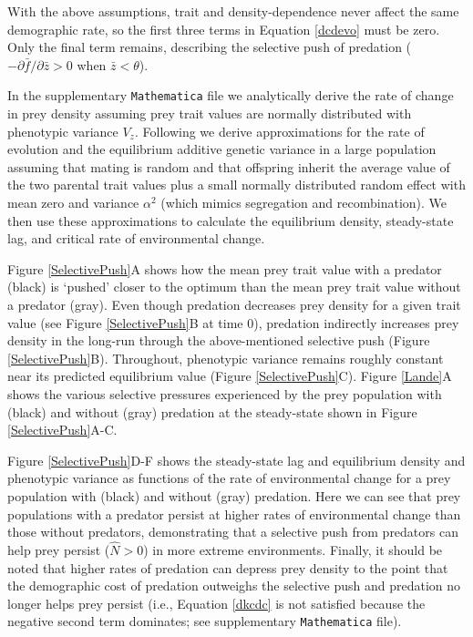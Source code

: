 \documentclass[11pt]{article}
\begin{document}
With the above assumptions, trait and density-dependence never affect the same demographic rate, so the first three terms in Equation \eqref{dcdevo} must be zero. 
Only the final term remains, describing the selective push of predation ($-\partial \bar{f}/\partial \bar{z}>0$ when $\bar{z}<\theta$).

In the supplementary \texttt{Mathematica} file we analytically derive the rate of change in prey density assuming prey trait values are normally distributed with phenotypic variance $V_z$. 
Following \cite{Debarre2016} we derive approximations for the rate of evolution and the equilibrium additive genetic variance in a large population assuming that mating is random and that offspring inherit the average value of the two parental trait values plus a small normally distributed random effect with mean zero and variance $\alpha^2$ (which mimics segregation and recombination).
We then use these approximations to calculate the equilibrium density, steady-state lag, and critical rate of environmental change.

Figure \ref{SelectivePush}A shows how the mean prey trait value with a predator (black) is `pushed' closer to the optimum than the mean prey trait value without a predator (gray). 
Even though predation decreases prey density for a given trait value (see Figure \ref{SelectivePush}B at time 0), predation indirectly increases prey density in the long-run through the above-mentioned selective push (Figure \ref{SelectivePush}B).
Throughout, phenotypic variance remains roughly constant near its predicted equilibrium value (Figure \ref{SelectivePush}C).
Figure \ref{Lande}A shows the various selective pressures experienced by the prey population with (black) and without (gray) predation at the steady-state shown in Figure \ref{SelectivePush}A-C.

Figure \ref{SelectivePush}D-F shows the steady-state lag and equilibrium density and phenotypic variance as functions of the rate of environmental change for a prey population with (black) and without (gray) predation.
Here we can see that prey populations with a predator persist at higher rates of environmental change than those without predators, demonstrating that a selective push from predators can help prey persist ($\hat{N}>0$) in more extreme environments.
Finally, it should be noted that higher rates of predation can depress prey density to the point that the demographic cost of predation outweighs the selective push and predation no longer helps prey persist (i.e., Equation \ref{dkcdc} is not satisfied because the negative second term dominates; see supplementary \texttt{Mathematica} file).
\end{document}
